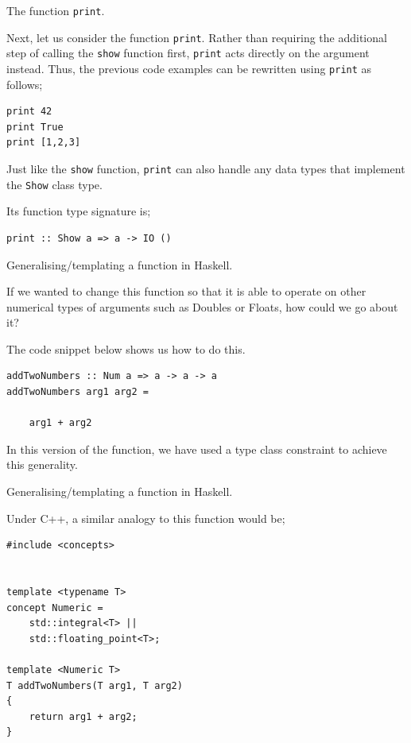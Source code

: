 \begin{frame}[t, fragile]{The function \texttt{print}.}

Next, let us consider the function \texttt{print}. Rather than requiring the additional step of calling the \texttt{show} function first, \texttt{print} acts directly on the argument instead. Thus, the previous code examples can be
rewritten using \texttt{print} as follows; 

\begin{verbatim}
print 42
print True
print [1,2,3]
\end{verbatim}

Just like the \texttt{show} function, \texttt{print} can also handle any data types that implement the \texttt{Show} class type.

Its function type signature is;

\begin{verbatim}
print :: Show a => a -> IO ()
\end{verbatim}

\end{frame}


\begin{frame}[t, fragile]{Generalising/templating a function in Haskell.}

If we wanted to change this function so that it is able to operate
on other numerical types of arguments such as Doubles or Floats, how could
we go about it?

The code snippet below shows us how to do this.

\begin{verbatim}
addTwoNumbers :: Num a => a -> a -> a
addTwoNumbers arg1 arg2 =

    arg1 + arg2
\end{verbatim}

In this version of the function, we have used a type class constraint
to achieve this generality.

\end{frame}


\begin{frame}[t, fragile]{Generalising/templating a function in Haskell.}

Under C++, a similar analogy to this function would be;

\begin{verbatim}
#include <concepts>


template <typename T>
concept Numeric =
    std::integral<T> ||
    std::floating_point<T>;

template <Numeric T>
T addTwoNumbers(T arg1, T arg2)
{
    return arg1 + arg2;
}
\end{verbatim}

\end{frame}
